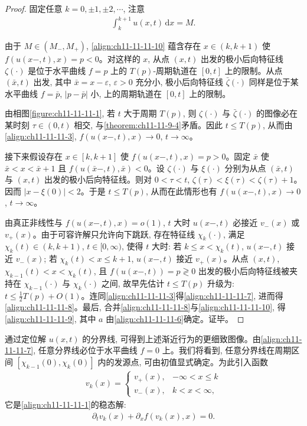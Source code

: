 \documentclass[../../main.tex]{subfiles}
\begin{document}
\begin{proof}
固定任意 $k=0,\pm1,\pm2,\cdots$, 注意
\begin{align}
\int_k^{k+1}u(x,t)\,\mathrm{d}x=M.\label{align:ch11-11-11-10}
\end{align}

由于 $M\in(M_-,M_+)$, \eqref{align:ch11-11-11-10} 蕴含存在 $x\in(k,k+1)$ 使 $f(u(x-,t),x)=p<0$。对这样的 $x$, 从点 $(x,t)$ 出发的极小后向特征线 $\zeta(\cdot)$ 是位于水平曲线 $f=p$ 上的 $T(p)$-周期轨道在 $[0,t]$ 上的限制。从点 $(\bar x,t)$ 出发, 其中 $\bar x=x-\varepsilon$, $\varepsilon>0$ 充分小, 极小后向特征线 $\bar\zeta(\cdot)$ 同样是位于某水平曲线 $f=\bar p$, $|p-\bar p|$ 小, 上的周期轨道在 $[0,t]$ 上的限制。

由相图\cref{figure:ch11-11-11-1}, 若 $t$ 大于周期 $T(p)$, 则 $\zeta(\cdot)$ 与 $\bar\zeta(\cdot)$ 的图像必在某时刻 $\tau\in(0,t)$ 相交, 与\cref{theorem:ch11-11-9-4}矛盾。因此 $t\leqslant T(p)$, 从而由\eqref{align:ch11-11-11-3}, $f(u(x-,t),x)\to0$, $t\to\infty$。

接下来假设存在 $x\in[k,k+1]$ 使 $f(u(x-,t),x)=p>0$。固定 $\bar x$ 使 $\bar x<x<\bar x+1$ 且 $f(u(\bar x-,t),\bar x)<0$。设 $\zeta(\cdot)$ 与 $\xi(\cdot)$ 分别为从点 $(\bar x,t)$ 与 $(x,t)$ 出发的极小后向特征线。则对 $0<\tau<t$, $\zeta(\tau)<\xi(\tau)<\zeta(\tau)+1$。因而 $|x-\xi(0)|<2$。于是 $t\leqslant T(p)$, 从而在此情形也有 $f(u(x-,t),x)\to0$, $t\to\infty$。

由真正非线性与 $f(u(x-,t),x)=o(1)$, $t$ 大时 $u(x-,t)$ 必接近 $v_-(x)$ 或 $v_+(x)$。由于可容许解只允许向下跳跃, 存在特征线 $\chi_k(\cdot)$, 满足 $\chi_k(t)\in(k,k+1)$, $t\in[0,\infty)$, 使得 $t$ 大时: 若 $k\leqslant x<\chi_k(t)$, $u(x-,t)$ 接近 $v_-(x)$; 若 $\chi_k(t)<x\leqslant k+1$, $u(x-,t)$ 接近 $v_+(x)$。从点 $(x,t)$, $\chi_{k-1}(t)<x<\chi_k(t)$, 且 $f(u(x-,t))=p\gtrless0$ 出发的极小后向特征线被夹持在 $\chi_{k-1}(\cdot)$ 与 $\chi_k(\cdot)$ 之间, 故早先估计 $t\leqslant T(p)$ 升级为: $t\leqslant\frac12 T(p)+O(1)$。连同\eqref{align:ch11-11-11-3}得\eqref{align:ch11-11-11-7}, 进而得\eqref{align:ch11-11-11-8}。最后, 合并\eqref{align:ch11-11-11-8}与\eqref{align:ch11-11-11-10}, 得\eqref{align:ch11-11-11-9}, 其中 $a$ 由\eqref{align:ch11-11-11-6}确定。证毕。
\end{proof}

通过定位解 $u(x,t)$ 的分界线, 可得到上述渐近行为的更细致图像。由\eqref{align:ch11-11-11-7}, 任意分界线必位于水平曲线 $f=0$ 上。我们将看到, 任意分界线在周期区间 $[\chi_{k-1}(0),\chi_k(0)]$ 内的发源点, 可由初值显式确定。为此引入函数
\begin{align}
v_k(x)=
\begin{cases}
v_+(x), & -\infty<x\leqslant k\\
v_-(x), & k<x<\infty,
\end{cases}\label{align:ch11-11-11-11}
\end{align}
它是\eqref{align:ch11-11-11-1}的稳态解:
\begin{align}
\partial_t v_k(x)+\partial_x f(v_k(x),x)=0.\label{align:ch11-11-11-12}
\end{align}
\end{document}
